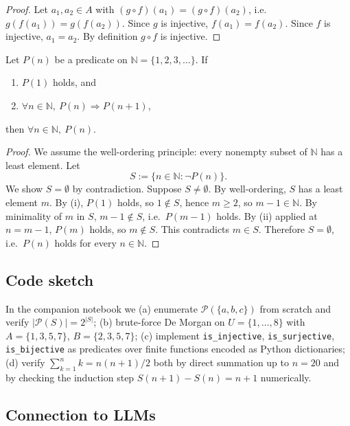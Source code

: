 \begin{proof}
Let $a_1, a_2 \in A$ with $(g \circ f)(a_1) = (g \circ f)(a_2)$, i.e.\ $g(f(a_1)) = g(f(a_2))$. Since $g$ is injective, $f(a_1) = f(a_2)$. Since $f$ is injective, $a_1 = a_2$. By definition $g \circ f$ is injective.
\end{proof}

\begin{theorem}\label{thm:induction}
Let $P(n)$ be a predicate on $\mathbb{N} = \{1, 2, 3, \ldots\}$. If
\begin{enumerate}
  \item[\textup{(i)}] $P(1)$ holds, and
  \item[\textup{(ii)}] $\forall n \in \mathbb{N},\ P(n) \Rightarrow P(n+1)$,
\end{enumerate}
then $\forall n \in \mathbb{N},\ P(n)$.
\end{theorem}

\begin{proof}
We assume the well-ordering principle: every nonempty subset of $\mathbb{N}$ has a least element. Let
\[
S := \{n \in \mathbb{N} : \neg P(n)\}.
\]
We show $S = \emptyset$ by contradiction. Suppose $S \neq \emptyset$. By well-ordering, $S$ has a least element $m$. By (i), $P(1)$ holds, so $1 \notin S$, hence $m \geq 2$, so $m - 1 \in \mathbb{N}$. By minimality of $m$ in $S$, $m - 1 \notin S$, i.e.\ $P(m-1)$ holds. By (ii) applied at $n = m - 1$, $P(m)$ holds, so $m \notin S$. This contradicts $m \in S$. Therefore $S = \emptyset$, i.e.\ $P(n)$ holds for every $n \in \mathbb{N}$.
\end{proof}

\subsection*{Code sketch}

In the companion notebook we (a) enumerate $\mathcal{P}(\{a,b,c\})$ from scratch and verify $|\mathcal{P}(S)| = 2^{|S|}$; (b) brute-force De Morgan on $U = \{1, \ldots, 8\}$ with $A = \{1,3,5,7\}$, $B = \{2,3,5,7\}$; (c) implement \texttt{is\_injective}, \texttt{is\_surjective}, \texttt{is\_bijective} as predicates over finite functions encoded as Python dictionaries; (d) verify $\sum_{k=1}^{n} k = n(n+1)/2$ both by direct summation up to $n=20$ and by checking the induction step $S(n+1) - S(n) = n+1$ numerically.

\subsection*{Connection to LLMs}

